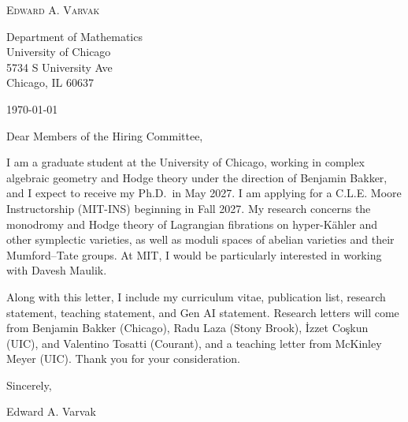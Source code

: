 \documentclass[12pt]{article}
\begin{document}
\begin{center}
  {\Large\textsc{Edward A. Varvak}}\\[10pt]
\end{center}

Department of Mathematics \\
University of Chicago \\
5734 S University Ave \\
Chicago, IL 60637

\today

Dear Members of the Hiring Committee,

I am a graduate student at the University of Chicago, working in complex
algebraic geometry and Hodge theory under the direction of Benjamin Bakker,
and I expect to receive my Ph.D.\ in May 2027. I am applying for a C.L.E.
Moore Instructorship (\mbox{MIT-INS}) beginning in Fall 2027. My research
concerns the monodromy and Hodge theory of Lagrangian fibrations on
hyper-K\"ahler and other symplectic varieties, as well as moduli spaces of
abelian varieties and their Mumford--Tate groups. At MIT, I would be
particularly interested in working with Davesh Maulik.

Along with this letter, I include my curriculum vitae, publication list,
research statement, teaching statement, and Gen AI statement. Research
letters will come from Benjamin Bakker (Chicago), Radu Laza (Stony Brook),
\.{I}zzet Co\c{s}kun (UIC), and Valentino Tosatti (Courant), and a teaching
letter from McKinley Meyer (UIC). Thank you for your consideration.

Sincerely,

Edward A. Varvak
\end{document}
